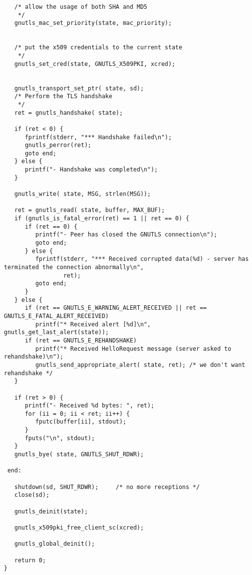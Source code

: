 \begin{verbatim}
   /* allow the usage of both SHA and MD5
    */
   gnutls_mac_set_priority(state, mac_priority);


   /* put the x509 credentials to the current state
    */
   gnutls_set_cred(state, GNUTLS_X509PKI, xcred);


   gnutls_transport_set_ptr( state, sd);
   /* Perform the TLS handshake
    */
   ret = gnutls_handshake( state);

   if (ret < 0) {
      fprintf(stderr, "*** Handshake failed\n");
      gnutls_perror(ret);
      goto end;
   } else {
      printf("- Handshake was completed\n");
   }

   gnutls_write( state, MSG, strlen(MSG));

   ret = gnutls_read( state, buffer, MAX_BUF);
   if (gnutls_is_fatal_error(ret) == 1 || ret == 0) {
      if (ret == 0) {
         printf("- Peer has closed the GNUTLS connection\n");
         goto end;
      } else {
         fprintf(stderr, "*** Received corrupted data(%d) - server has terminated the connection abnormally\n",
                 ret);
         goto end;
      }
   } else {
      if (ret == GNUTLS_E_WARNING_ALERT_RECEIVED || ret == GNUTLS_E_FATAL_ALERT_RECEIVED)
         printf("* Received alert [%d]\n", gnutls_get_last_alert(state));
      if (ret == GNUTLS_E_REHANDSHAKE)
         printf("* Received HelloRequest message (server asked to rehandshake)\n");
         gnutls_send_appropriate_alert( state, ret); /* we don't want rehandshake */
   }

   if (ret > 0) {
      printf("- Received %d bytes: ", ret);
      for (ii = 0; ii < ret; ii++) {
         fputc(buffer[ii], stdout);
      }
      fputs("\n", stdout);
   }
   gnutls_bye( state, GNUTLS_SHUT_RDWR);

 end:

   shutdown(sd, SHUT_RDWR);     /* no more receptions */
   close(sd);

   gnutls_deinit(state);

   gnutls_x509pki_free_client_sc(xcred);

   gnutls_global_deinit();

   return 0;
}

\end{verbatim}

